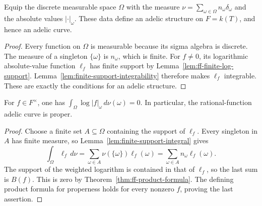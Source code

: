 \begin{definition}\label{def:ff-adelic-structure}
\leanok
{}
Equip the discrete measurable space $\Omega$ with the measure
$\nu=\sum_{\omega\in\Omega}n_\omega\delta_\omega$ and the absolute
values $|\cdot|_\omega$. These data define an adelic structure on
$F=k(T)$, and hence an adelic curve.
\end{definition}
\begin{proof}
Every function on $\Omega$ is measurable because its sigma algebra is
discrete. The measure of a singleton $\{\omega\}$ is $n_\omega$, which
is finite. For $f\ne0$, its logarithmic absolute-value function
$\ell_f$ has finite support by Lemma~\ref{lem:ff-finite-log-support}.
Lemma~\ref{lem:finite-support-integrability} therefore makes $\ell_f$
integrable. These are exactly the conditions for an adelic structure.
\end{proof}

\begin{theorem}
\label{thm:ff-integral-product-formula}
\leanok
{}
For $f\in F^\times$, one has
$\int_\Omega\log|f|_\omega\,d\nu(\omega)=0$.
In particular, the rational-function adelic curve is proper.
\end{theorem}
\begin{proof}
Choose a finite set $A\subseteq\Omega$ containing the support of
$\ell_f$. Every singleton in $A$ has finite measure, so
Lemma~\ref{lem:finite-support-integral} gives
\[
 \int_\Omega\ell_f\,d\nu
 =\sum_{\omega\in A}\nu(\{\omega\})\ell_f(\omega)
 =\sum_{\omega\in A}n_\omega\ell_f(\omega).
\]
The support of the weighted logarithm is contained in that of
$\ell_f$, so the last sum is $B(f)$. This is zero by
Theorem~\ref{thm:ff-product-formula}. The defining product formula for
properness holds for every nonzero $f$, proving the last assertion.
\end{proof}
